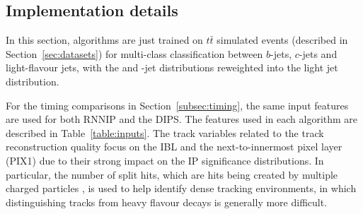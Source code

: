 \subsection{Implementation details} 
\label{subsec:algdetails}


In this section, algorithms are just trained on $t\bar{t}$ simulated events (described in Section~\ref{sec:datasets}) for multi-class classification between $b$-jets, $c$-jets and light-flavour jets, with the \Pqb and \Pqc-jet distributions reweighted into the light jet distribution. 

For the timing comparisons in Section~\ref{subsec:timing}, the same input features are used for both RNNIP and the DIPS. 
The features used in each algorithm are described in Table~\ref{table:inputs}.
The track variables related to the track reconstruction quality focus on the IBL and the next-to-innermost pixel layer (PIX1) due to their strong impact on the IP significance distributions. 
In particular, the number of split hits, which are hits being created by multiple charged particles \cite{PERF-2012-05}, is used to help identify dense tracking environments, in which distinguishing tracks from  heavy flavour decays is generally  more difficult. 


